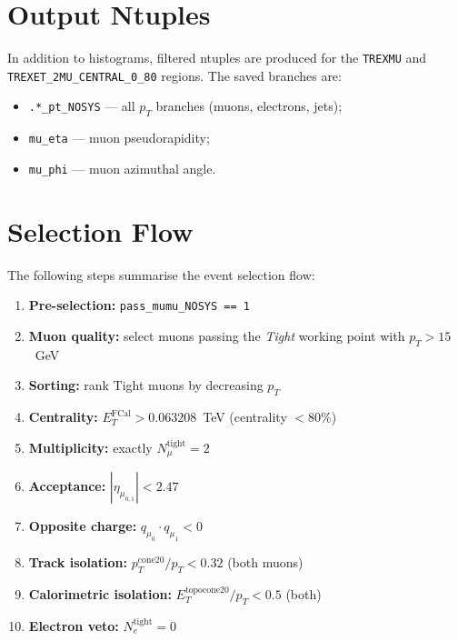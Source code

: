 \documentclass[12pt,a4paper]{article}
\begin{document}
\section{Output Ntuples}

In addition to histograms, filtered ntuples are produced for the
\texttt{TREXMU} and \texttt{TREXET\_2MU\_CENTRAL\_0\_80} regions. The saved branches are:

\begin{itemize}
    \item \texttt{.*\_pt\_NOSYS} --- all $p_T$ branches (muons, electrons, jets);
    \item \texttt{mu\_eta} --- muon pseudorapidity;
    \item \texttt{mu\_phi} --- muon azimuthal angle.
\end{itemize}

\section{Selection Flow}

The following steps summarise the event selection flow:

\begin{enumerate}
    \item \textbf{Pre-selection:} \texttt{pass\_mumu\_NOSYS == 1}
    \item \textbf{Muon quality:} select muons passing the \textit{Tight} working point
          with $p_T > 15$~GeV
    \item \textbf{Sorting:} rank Tight muons by decreasing $p_T$
    \item \textbf{Centrality:} $E_T^{\text{FCal}} > 0.063208$~TeV (centrality $< 80\%$)
    \item \textbf{Multiplicity:} exactly $N_\mu^{\text{tight}} = 2$
    \item \textbf{Acceptance:} $|\eta_{\mu_{0,1}}| < 2.47$
    \item \textbf{Opposite charge:} $q_{\mu_0} \cdot q_{\mu_1} < 0$
    \item \textbf{Track isolation:} $p_T^{\text{cone20}} / p_T < 0.32$ (both muons)
    \item \textbf{Calorimetric isolation:} $E_T^{\text{topocone20}} / p_T < 0.5$ (both)
    \item \textbf{Electron veto:} $N_e^{\text{tight}} = 0$
\end{enumerate}
\end{document}
